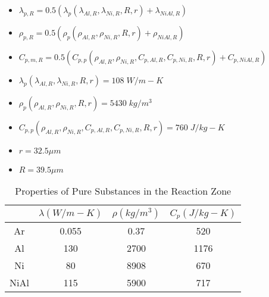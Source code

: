 \documentclass[../main.tex]{subfiles}
\begin{document}
\begin{itemize}
    \item $\lambda_{p,R} = 0.5 \left( \lambda_p \left( \lambda_{Al,R}, \lambda_{Ni,R}, R, r \right) + \lambda_{NiAl, R} \right)$
    \item $\rho_{p,R} = 0.5 \left( \rho_p \left( \rho_{Al,R}, \rho_{Ni,R}, R, r \right) + \rho_{NiAl,R} \right)$
    \item $C_{p,m,R} = 0.5 \left( C_{p,p} \left( \rho_{Al,R}, \rho_{Ni,R}, C_{p,Al,R}, C_{p,Ni,R}, R, r \right) + C_{p,NiAl,R} \right)$
    \item $\lambda_p \left( \lambda_{Al,R}, \lambda_{Ni,R}, R, r \right) = 108\;W/m-K$
    \item $\rho_p \left( \rho_{Al,R}, \rho_{Ni,R}, R, r \right) = 5430\;kg/m^3$
    \item $C_{p,p} \left( \rho_{Al,R}, \rho_{Ni,R}, C_{p,Al,R}, C_{p,Ni,R}, R, r \right) = 760\;J/kg-K$
    \item $r = 32.5 \mu m$
    \item $R = 39.5 \mu m$
\end{itemize}

\begin{table}[htbp]
    \centering
    \begin{tabular}{c|c|c|c}
         & $\lambda \left( W/m-K \right)$ & $\rho \left( kg/m^3 \right)$ & $C_p \left( J/kg-K \right)$ \\
         \hline
         Ar   & 0.055 & 0.37 & 520  \\
         Al   & 130   & 2700 & 1176 \\
         Ni   & 80    & 8908 & 670  \\
         NiAl & 115   & 5900 & 717
    \end{tabular}
    \caption{Properties of Pure Substances in the Reaction Zone}
\end{table}
\end{document}
